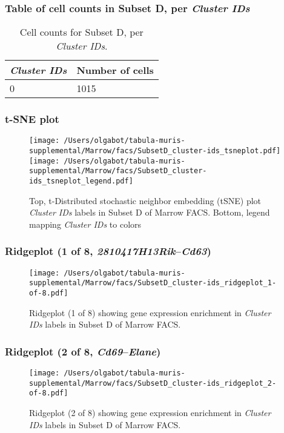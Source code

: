\subsubsection{Table of cell counts in Subset D, per \emph{Cluster IDs}}\begin{table}[h]
\centering
\label{my-label}
\begin{tabular}{@{}ll@{}}
\toprule

\emph{Cluster IDs}& Number of cells \\ \midrule
0 & 1015 \\
\bottomrule
\end{tabular}
\caption{Cell counts for Subset D, per \emph{Cluster IDs}.}
\end{table}

\clearpage
\subsubsection{t-SNE plot}
\begin{figure}[h]
\centering
\texttt{[image: /Users/olgabot/tabula-muris-supplemental/Marrow/facs/SubsetD\_cluster-ids\_tsneplot.pdf]}
\texttt{[image: /Users/olgabot/tabula-muris-supplemental/Marrow/facs/SubsetD\_cluster-ids\_tsneplot\_legend.pdf]}
\caption{Top, t-Distributed stochastic neighbor embedding (tSNE) plot  \emph{Cluster IDs} labels in Subset D of Marrow FACS. Bottom, legend mapping \emph{Cluster IDs} to colors}
\end{figure}


\clearpage

\subsubsection{Ridgeplot (1 of 8, \emph{2810417H13Rik}--\emph{Cd63})}
\begin{figure}[h]
\centering
\texttt{[image: /Users/olgabot/tabula-muris-supplemental/Marrow/facs/SubsetD\_cluster-ids\_ridgeplot\_1-of-8.pdf]}

\caption{ Ridgeplot (1 of 8)  showing gene expression enrichment in \emph{Cluster IDs} labels in Subset D of Marrow FACS. }
\end{figure}


\clearpage

\subsubsection{Ridgeplot (2 of 8, \emph{Cd69}--\emph{Elane})}
\begin{figure}[h]
\centering
\texttt{[image: /Users/olgabot/tabula-muris-supplemental/Marrow/facs/SubsetD\_cluster-ids\_ridgeplot\_2-of-8.pdf]}

\caption{ Ridgeplot (2 of 8)  showing gene expression enrichment in \emph{Cluster IDs} labels in Subset D of Marrow FACS. }
\end{figure}


